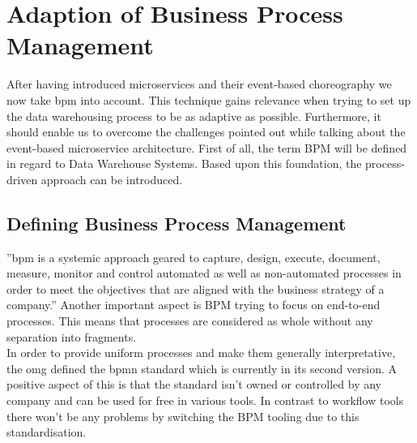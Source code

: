 \section{Adaption of Business Process Management}
\label{sec:bpm}
After having introduced microservices and their event-based choreography we now take \acrfull{bpm} into account. This technique gains relevance when trying to set up the data warehousing process to be as adaptive as possible. Furthermore, it should enable us to overcome the challenges pointed out while talking about the event-based microservice architecture.\newline
First of all, the term BPM will be defined in regard to Data Warehouse Systems. Based upon this foundation, the process-driven approach can be introduced. 

\subsection{Defining Business Process Management}
''\acrfull{bpm} is a systemic approach geared to capture, design, execute, document, measure, monitor and control automated as well as non-automated processes in order to meet the objectives that are aligned with the business strategy of a company.'' \cite{bpmDef} Another important aspect is BPM trying to focus on end-to-end processes. This means that processes are considered as whole without any separation into fragments. \cite{praxisBPM}\newline
\\
In order to provide uniform processes and make them generally interpretative, the \acrfull{omg} defined the \acrfull{bpmn} standard which is currently in its second version. A positive aspect of this is that the standard isn't owned or controlled by any company and can be used for free in various tools. In contrast to workflow tools there won't be any problems by switching the BPM tooling due to this standardisation. \cite{bpmMethodStyle}


